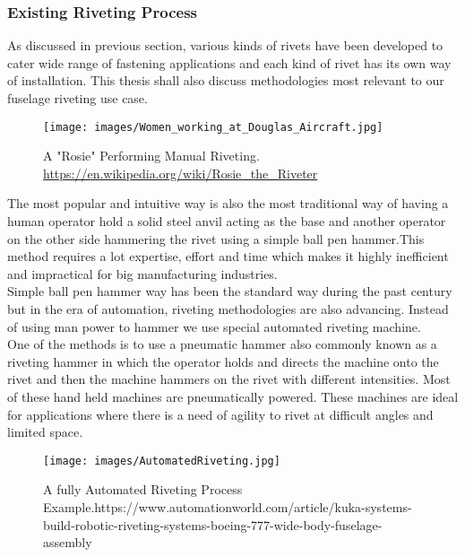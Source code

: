 \documentclass{article}
\begin{document}
\subsubsection{Existing Riveting Process}

As discussed in previous section, various kinds of rivets have been developed to cater wide range of fastening applications and each kind of rivet has its own way of installation. This thesis shall also discuss methodologies most relevant to our fuselage riveting use case.\\

\begin{figure}[htp]
    \centering
    \texttt{[image: images/Women\_working\_at\_Douglas\_Aircraft.jpg]}
    \caption{A "Rosie" Performing Manual Riveting. \url{https://en.wikipedia.org/wiki/Rosie_the_Riveter}}
    \label{fig: rosieManualRiveter}
\end{figure}



The most popular and intuitive way is also the most traditional way of having a human operator hold a solid steel anvil acting as the base and another operator on the other side hammering the rivet using a simple ball pen hammer.This method requires a lot expertise, effort and time which makes it highly inefficient and impractical for big manufacturing industries.\\

Simple ball pen hammer way has been the standard way during the past century but in the era of automation, riveting methodologies are also advancing. Instead of using man power to hammer we use special automated riveting machine.\\

One of the methods is to use a pneumatic hammer also commonly known as a riveting hammer in which the operator holds and directs the machine onto the rivet and then the machine hammers on the rivet with different intensities. Most of these hand held machines are pneumatically powered. These machines are ideal for applications where there is a need of agility to rivet at difficult angles and  limited space.\\

\begin{figure}[htp]
    \centering
    \texttt{[image: images/AutomatedRiveting.jpg]}
    \caption{A fully Automated Riveting Process Example.https://www.automationworld.com/article/kuka-systems-build-robotic-riveting-systems-boeing-777-wide-body-fuselage-assembly}
    \label{fig: rosieManualRiveter}
\end{figure}
\end{document}
